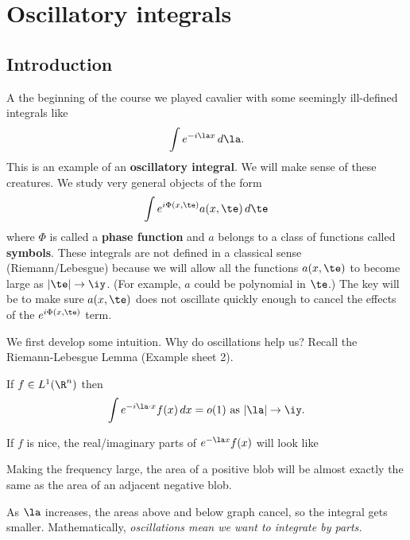 \chapter{Oscillatory integrals}
\section{Introduction}
A the beginning of the course we played cavalier with some seemingly ill-defined integrals like
\[
\int e^{-i\la x}\,d\la.
\]
This is an example of an \textbf{oscillatory integral}. We will make sense of these creatures. We study very general objects of the form 
\[
\int e^{i\Phi(x,\te)}a(x,\te)\,d\te
\]
where $\Phi$ is called a \textbf{phase function} and $a$ belongs to a class of functions called \textbf{symbols}. These integrals are not defined in a classical sense (Riemann/Lebesgue) because we will allow all the functions $a(x,\te)$ to become large as $|\te|\to \iy$. (For example, $a$ could be polynomial in $\te$.)
The key will be to make sure $a(x,\te)$ does not oscillate quickly enough to cancel the effects of the $e^{i\Phi(x,\te)}$ term.

We first develop some intuition. Why do oscillations help us?
Recall the Riemann-Lebesgue Lemma (Example sheet 2). 
\begin{lem}
If $f\in L^1(\R^n)$ then 
\[
\int e^{-i\la\cdot x}f(x)\,dx=o(1) \text{ as }|\la|\to \iy.
\]
\end{lem}
If $f$ is nice, the real/imaginary parts of $e^{-\la x}f(x)$ will look like


Making the frequency large, the area of a positive blob will be almost exactly the same as the area of an adjacent negative blob. 


As $\la$ increases, the areas above and below graph cancel, so the integral gets smaller.
Mathematically, {\it oscillations mean we want to integrate by parts.}\\


\vskip0.15in

